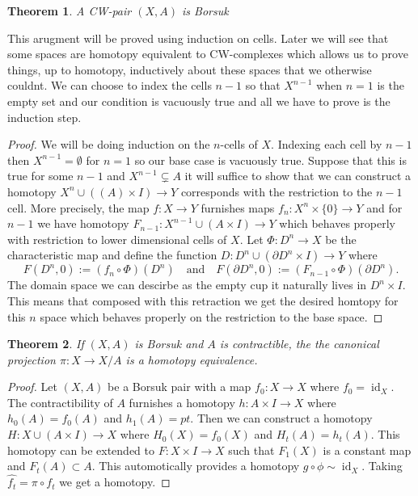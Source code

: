 \documentclass[40pt]{article}
\newtheorem{theorem}{Theorem}[section]
\DeclareMathOperator{\id}{\text{id}}
\begin{document}
		\begin{theorem}
			A CW-pair $(X,A)$ is Borsuk
		\end{theorem}
		This arugment will be proved using induction on cells. Later we will see that some spaces are homotopy equivalent to CW-complexes which allows us to prove things, up to homotopy, inductively about these spaces that we otherwise couldnt. We can choose to index the cells $n - 1$ so that $X^{n-1}$ when $n = 1$ is the empty set and our condition is vacuously true and all we have to prove is the induction step. 
		\begin{proof}
			We will be doing induction on the $n$-cells of $X$. Indexing each cell by $n -1$ then $X^{n-1} = \emptyset $ for $n = 1$ so our base case is vacuously true. Suppose that this is true for some $n- 1$ and $X^{n-1 } \subsetneq A$ it will suffice to show that we can construct a homotopy $X^n \cup( (A) \times I) \rightarrow Y$ corresponds with the restriction to the $n-1$ cell. More precisely, the map $f:X\rightarrow Y$ furnishes maps $f_n : X^n \times \{0\} \rightarrow Y$ and for $n-1$ we have homotopy $F_{n-1} : X^{n-1} \cup (A \times I ) \rightarrow Y$ which behaves properly with restriction to lower dimensional cells of $X$. Let $\Phi : D^n \rightarrow X$ be the characteristic map and define the function $D : D^n \cup (\partial D^n \times I) \rightarrow Y $ where 
			\[
			F(D^n, 0) := (f_n \circ \Phi)(D^n) \quad\text{and}\quad F(\partial D^n, 0) := (F_{n-1} \circ \Phi)(\partial D^n).
			\]
			The domain space we can descirbe as the empty cup it naturally lives in $D^n \times I$. This means that composed with this retraction we get the desired homtopy for this $n$ space which behaves properly on the restriction to the base space.
		\end{proof}
		\begin{theorem}
			If $(X,A)$ is Borsuk and $A$ is contractible, the the canonical projection $\pi: X \rightarrow X/A$ is a homotopy equivalence. 
		\end{theorem}
		\begin{proof}
			Let $(X,A)$ be a Borsuk pair with a map $f_0 : X \rightarrow X$ where $f_0 = \id_X$. The contractibility of $A$ furnishes a homotopy $h: A \times I \rightarrow X$ where $h_0(A) = f_0(A)$ and $h_1(A) = pt$. Then we can construct a homotopy $H: X \cup (A \times I) \rightarrow X$ where $H_0(X) = f_0(X)$ and $H_t(A) = h_t(A)$. This homotopy can be extended to $F: X \times I \rightarrow X$ such that $F_1(X)$ is a constant map and $F_t(A) \subset A$. This automotically provides a homotopy $g \circ \phi \sim \id_X$. Taking $\hat{f_t} = \pi \circ f_t$ we get a homotopy.   
		\end{proof}
\end{document}
